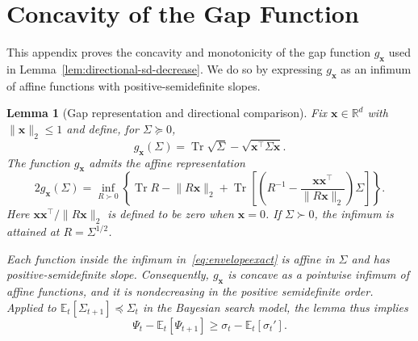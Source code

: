 \documentclass[11pt]{article}
\newtheorem{lemma}[theorem]{Lemma}
\newcommand{\Esub}[2]{\mathbb E_{#1}\left[#2\right]}
\newcommand{\R}{\mathbb R}
\newcommand{\Et}{\mathbb E_t}
\DeclareMathOperator{\Tr}{Tr}
\newcommand{\norm}[1]{\lVert #1\rVert_2}
\newcommand{\bx}{\boldsymbol x}
\begin{document}
\section{Concavity of the Gap Function}\label{app:gap-concavity}

This appendix proves the concavity and monotonicity of the gap function $g_{\bx}$ used in Lemma~\ref{lem:directional-sd-decrease}. We do so by expressing $g_{\bx}$ as an infimum of affine functions with positive-semidefinite slopes.

\begin{lemma}[Gap representation and directional comparison]\label{lem:envelope}
Fix $\bx\in\R^d$ with $\norm{\bx}\le1$ and define, for $\Sigma\succeq0$,
\begin{equation}\label{eq:bayesian-potential}
g_{\bx}(\Sigma)=\Tr\sqrt{\Sigma}-\sqrt{\bx^\top\Sigma\bx}.
\end{equation}
The function $g_{\bx}$ admits the affine representation
\begin{equation}\label{eq:envelopeexact}
 2g_{\bx}(\Sigma)=\inf_{R\succ0}\left\{
 \Tr R-\norm{R\bx}
 +\Tr\!\left[\left(R^{-1}-\frac{\bx\bx^\top}{\norm{R\bx}}\right)\Sigma\right]\right\}.
\end{equation}
Here $\bx\bx^\top/\norm{R\bx}$ is defined to be zero when $\bx=0$. If $\Sigma\succ0$, the infimum is attained at $R=\Sigma^{1/2}$.

Each function inside the infimum in~\eqref{eq:envelopeexact} is affine in $\Sigma$ and has positive-semidefinite slope. Consequently, $g_{\bx}$ is concave as a pointwise infimum of affine functions, and it is {nondecreasing in the positive semidefinite order}. Applied to $\Et[\Sigma_{t+1}]\preceq\Sigma_t$  in the Bayesian search model, the lemma thus implies
\begin{equation}\label{eq:directional-comparison}
 \Psi_t-\Esub{t}{\Psi_{t+1}}\ge\sigma_t-\Esub{t}{\sigma_t'}.
\end{equation}
\end{lemma}
\end{document}
